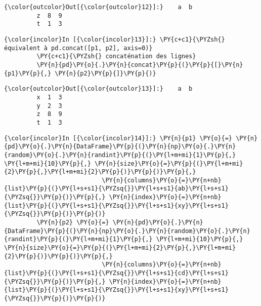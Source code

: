 \begin{Verbatim}[commandchars=\\\{\},frame=single,framerule=0.3mm,rulecolor=\color{cellframecolor}]
{\color{outcolor}Out[{\color{outcolor}12}]:}    a  b
         z  8  9
         t  1  3
\end{Verbatim}
            
    \begin{Verbatim}[commandchars=\\\{\},frame=single,framerule=0.3mm,rulecolor=\color{cellframecolor}]
{\color{incolor}In [{\color{incolor}13}]:} \PY{c+c1}{\PYZsh{} équivalent à pd.concat([p1, p2], axis=0)}
         \PY{c+c1}{\PYZsh{} concaténation des lignes}
         \PY{n}{pd}\PY{o}{.}\PY{n}{concat}\PY{p}{(}\PY{p}{[}\PY{n}{p1}\PY{p}{,} \PY{n}{p2}\PY{p}{]}\PY{p}{)}
\end{Verbatim}


\begin{Verbatim}[commandchars=\\\{\},frame=single,framerule=0.3mm,rulecolor=\color{cellframecolor}]
{\color{outcolor}Out[{\color{outcolor}13}]:}    a  b
         x  1  3
         y  2  3
         z  8  9
         t  1  3
\end{Verbatim}
            
    \begin{Verbatim}[commandchars=\\\{\},frame=single,framerule=0.3mm,rulecolor=\color{cellframecolor}]
{\color{incolor}In [{\color{incolor}14}]:} \PY{n}{p1} \PY{o}{=} \PY{n}{pd}\PY{o}{.}\PY{n}{DataFrame}\PY{p}{(}\PY{n}{np}\PY{o}{.}\PY{n}{random}\PY{o}{.}\PY{n}{randint}\PY{p}{(}\PY{l+m+mi}{1}\PY{p}{,} \PY{l+m+mi}{10}\PY{p}{,} \PY{n}{size}\PY{o}{=}\PY{p}{(}\PY{l+m+mi}{2}\PY{p}{,}\PY{l+m+mi}{2}\PY{p}{)}\PY{p}{)}\PY{p}{,}
                           \PY{n}{columns}\PY{o}{=}\PY{n+nb}{list}\PY{p}{(}\PY{l+s+s1}{\PYZsq{}}\PY{l+s+s1}{ab}\PY{l+s+s1}{\PYZsq{}}\PY{p}{)}\PY{p}{,} \PY{n}{index}\PY{o}{=}\PY{n+nb}{list}\PY{p}{(}\PY{l+s+s1}{\PYZsq{}}\PY{l+s+s1}{xy}\PY{l+s+s1}{\PYZsq{}}\PY{p}{)}\PY{p}{)}
         \PY{n}{p2} \PY{o}{=} \PY{n}{pd}\PY{o}{.}\PY{n}{DataFrame}\PY{p}{(}\PY{n}{np}\PY{o}{.}\PY{n}{random}\PY{o}{.}\PY{n}{randint}\PY{p}{(}\PY{l+m+mi}{1}\PY{p}{,} \PY{l+m+mi}{10}\PY{p}{,} \PY{n}{size}\PY{o}{=}\PY{p}{(}\PY{l+m+mi}{2}\PY{p}{,}\PY{l+m+mi}{2}\PY{p}{)}\PY{p}{)}\PY{p}{,}
                           \PY{n}{columns}\PY{o}{=}\PY{n+nb}{list}\PY{p}{(}\PY{l+s+s1}{\PYZsq{}}\PY{l+s+s1}{cd}\PY{l+s+s1}{\PYZsq{}}\PY{p}{)}\PY{p}{,} \PY{n}{index}\PY{o}{=}\PY{n+nb}{list}\PY{p}{(}\PY{l+s+s1}{\PYZsq{}}\PY{l+s+s1}{xy}\PY{l+s+s1}{\PYZsq{}}\PY{p}{)}\PY{p}{)}
\end{Verbatim}


